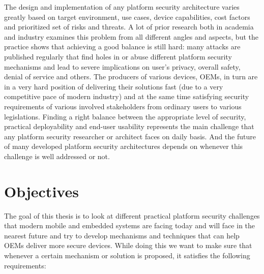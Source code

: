 The design and implementation of any platform security architecture varies greatly based on target environment, use cases, device capabilities, cost factors and prioritized set of risks and threats. A lot of prior research both in academia and industry examines this problem from all different angles and aspects, but the practice shows that achieving a good balance is still hard: many attacks are published regularly that find holes in or abuse different platform security mechanisms and lead to severe implications on user's privacy, overall safety, denial of service and others. The producers of various devices, OEMs, in turn are in a very hard position of delivering their solutions fast (due to a very competitive pace of modern industry) and at the same time satisfying security requirements of various involved stakeholders from ordinary users to various legislations. Finding a right balance between the appropriate level of security, practical deployability and end-user usability represents the main challenge that any platform security researcher or architect faces on daily basis. And the future of many developed platform security architectures depends on whenever this challenge is well addressed or not.   

\section{Objectives}
\label{sec:Objectives}

The goal of this thesis is to look at different practical platform security challenges that modern mobile and embedded systems are facing today and will face in the nearest future and try to develop mechanisms and techniques that can help OEMs deliver more secure devices. While doing this we want to make sure that whenever a certain mechanism or solution is proposed, it satisfies the following requirements:

